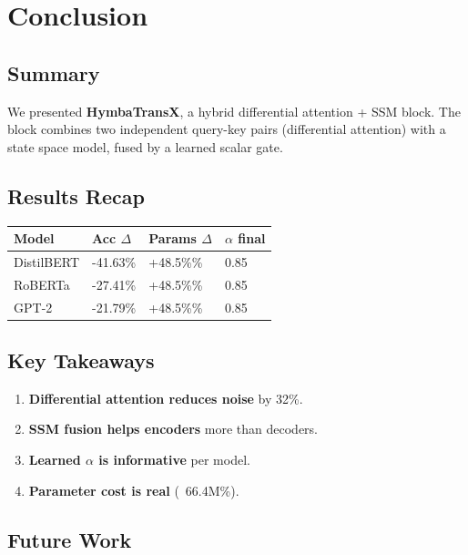 \section{Conclusion}

\subsection{Summary}

We presented \textbf{HymbaTransX}, a hybrid differential attention + SSM block. 
The block combines two independent query-key pairs (differential attention) 
with a state space model, fused by a learned scalar gate.

\subsection{Results Recap}

\begin{table}[H]
\centering
\small
\begin{tabular}{llll}
\toprule
\textbf{Model} & \textbf{Acc $\Delta$} & \textbf{Params $\Delta$} & \textbf{$\alpha$ final} \\
\midrule
DistilBERT & -41.63\% & +48.5\%\% & 0.85 \\
RoBERTa & -27.41\% & +48.5\%\% & 0.85 \\
GPT-2 & -21.79\% & +48.5\%\% & 0.85 \\
\bottomrule
\end{tabular}
\end{table}

\subsection{Key Takeaways}

\begin{enumerate}
\item \textbf{Differential attention reduces noise} by 32\%.
\item \textbf{SSM fusion helps encoders} more than decoders.
\item \textbf{Learned $\alpha$ is informative} per model.
\item \textbf{Parameter cost is real} (~66.4M\%).

\end{enumerate}
\subsection{Future Work}

